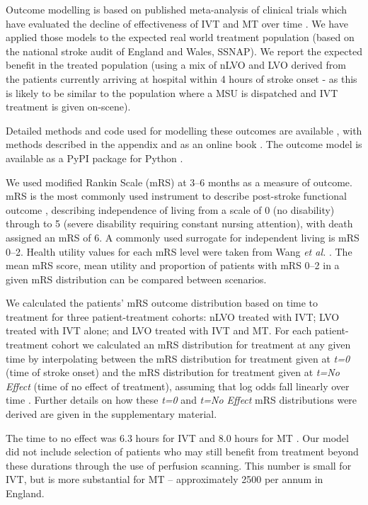 Outcome modelling is based on published meta-analysis of clinical trials which have evaluated the decline of effectiveness  of IVT and MT over time \cite{emberson_effect_2014, fransen_time_2016}. We have applied those models to the expected real world treatment population (based on the national stroke audit of England and Wales, SSNAP). We report the expected benefit in the treated population (using a mix of nLVO and LVO derived from the patients currently arriving at hospital within 4 hours of stroke onset - as this is likely to be similar to the population where a MSU is dispatched and IVT treatment is given on-scene). 

Detailed methods and code used for modelling these outcomes are available \cite{github2}, with methods described in the appendix and as an online book \cite{github3}. The outcome model is available as a PyPI package for Python \cite{pypi}.

We used modified Rankin Scale (mRS) at 3--6 months as a measure of outcome. mRS is the most commonly used instrument to describe post-stroke functional outcome \cite{quinn_functional_2009}, describing independence of living from a scale of 0 (no disability) through to 5 (severe disability requiring constant nursing attention), with death assigned an mRS of 6. A commonly used surrogate for independent living is mRS 0--2. Health utility values for each mRS level were taken from Wang \textit{et al.} \cite{wang_utility-weighted_2020}. The mean mRS score, mean utility and proportion of patients with mRS 0--2 in a given mRS distribution can be compared between scenarios.

We calculated the patients' mRS outcome distribution based on time to treatment for three patient-treatment cohorts: nLVO treated with IVT; LVO treated with IVT alone; and LVO treated with IVT and MT. For each patient-treatment cohort we calculated an mRS distribution for treatment at any given time by interpolating between the mRS distribution for treatment given at \emph{t=0} (time of stroke onset) and the mRS distribution for treatment given at \emph{t=No Effect} (time of no effect of treatment), assuming that log odds fall linearly over time \cite{emberson_effect_2014, fransen_time_2016}. Further details on how these \emph{t=0} and \emph{t=No Effect} mRS distributions were derived are given in the supplementary material.

The time to no effect was 6.3 hours for IVT \cite{emberson_effect_2014} and 8.0 hours for MT \cite{ fransen_time_2016}. Our model did not include selection of patients who may still benefit from treatment beyond these durations through the use of perfusion scanning. This number is small for IVT, but is more substantial for MT – approximately 2500 per annum in England. 

